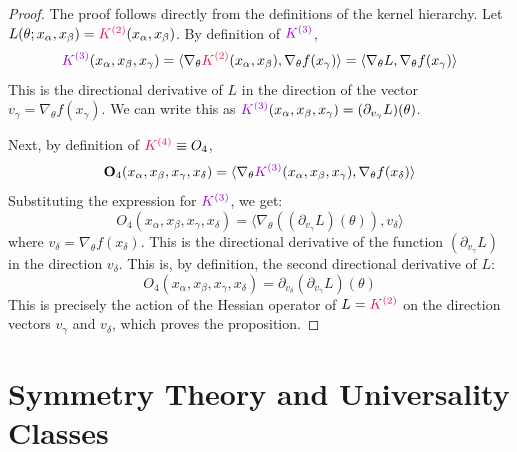 \documentclass[a4paper]{article}
\theoremstyle{plain}
\theoremstyle{definition}
\theoremstyle{remark}
\begin{document}
\begin{proof}
The proof follows directly from the definitions of the kernel hierarchy. Let $L(\theta; x_\alpha, x_\beta) = \textcolor{kernelcolor}{\textcolor{kernelcolor}{K}^{(2)}}(x_\alpha, x_\beta)$.
By definition of $\textcolor{k3color}{K^{(3)}}$,
\begin{equation}
\textcolor{k3color}{K^{(3)}}(x_\alpha, x_\beta, x_\gamma) = \langle \nabla_\theta \textcolor{kernelcolor}{\textcolor{kernelcolor}{K}^{(2)}}(x_\alpha, x_\beta), \nabla_\theta f(x_\gamma) \rangle = \langle \nabla_\theta L, \nabla_\theta f(x_\gamma) \rangle
\end{equation}
This is the directional derivative of $L$ in the direction of the vector $v_\gamma = \nabla_\theta f(x_\gamma)$. We can write this as $\textcolor{k3color}{K^{(3)}}(x_\alpha, x_\beta, x_\gamma) = (\partial_{v_\gamma} L)(\theta)$.

Next, by definition of $\textcolor{kernelcolor}{\textcolor{kernelcolor}{K}^{(4)}} \equiv O_4$,
\begin{equation}
\mathbf{O}_4(x_\alpha, x_\beta, x_\gamma, x_\delta) = \langle \nabla_\theta \textcolor{k3color}{K^{(3)}}(x_\alpha, x_\beta, x_\gamma), \nabla_\theta f(x_\delta) \rangle
\end{equation}
Substituting the expression for $\textcolor{k3color}{K^{(3)}}$, we get:
\begin{equation}
O_4(x_\alpha, x_\beta, x_\gamma, x_\delta) = \langle \nabla_\theta \left( (\partial_{v_\gamma} L)(\theta) \right), v_\delta \rangle
\end{equation}
where $v_\delta = \nabla_\theta f(x_\delta)$. This is the directional derivative of the function $(\partial_{v_\gamma} L)$ in the direction $v_\delta$. This is, by definition, the second directional derivative of $L$:
\begin{equation}
O_4(x_\alpha, x_\beta, x_\gamma, x_\delta) = \partial_{v_\delta} \left( \partial_{v_\gamma} L \right)(\theta)
\end{equation}
This is precisely the action of the Hessian operator of $L = \textcolor{kernelcolor}{\textcolor{kernelcolor}{K}^{(2)}}$ on the direction vectors $v_\gamma$ and $v_\delta$, which proves the proposition.
\end{proof}








\newpage

\section{Symmetry Theory and Universality Classes}\label{sec:symmetry_theory}
\end{document}
